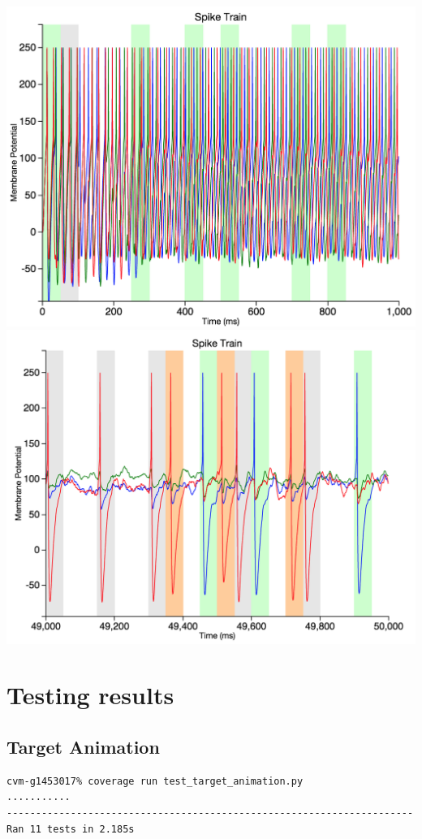 \documentclass[a4paper,11pt]{article}
\begin{document}
\begin{appendices}
\includegraphics[scale = 0.3]{multiple_beginning}
\includegraphics[scale = 0.3]{multiple_end}
\section{Testing results}
\subsection{Target Animation}
\begin{verbatim}
cvm-g1453017% coverage run test_target_animation.py
...........
----------------------------------------------------------------------
Ran 11 tests in 2.185s


\end{verbatim}
\end{appendices}
\end{document}
